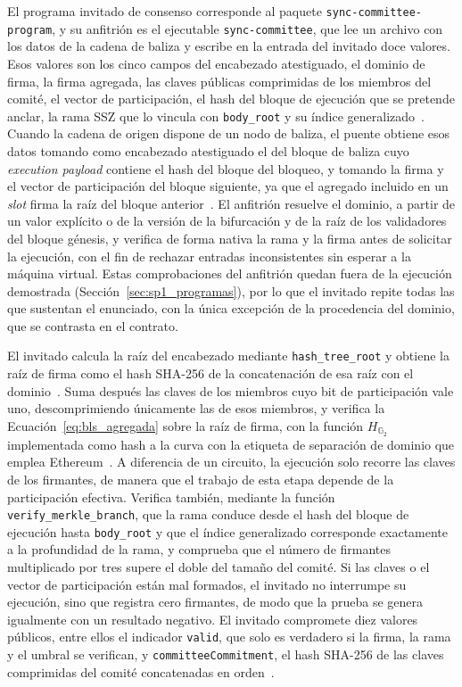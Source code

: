 El programa invitado de consenso corresponde al paquete \texttt{sync-committee-program}, y su
anfitrión es el ejecutable \texttt{sync-committee}, que lee un archivo con los datos de la cadena
de baliza y escribe en la entrada del invitado doce valores. Esos valores son los cinco campos del
encabezado atestiguado, el dominio de firma, la firma agregada, las claves públicas comprimidas
de los miembros del comité, el vector de participación, el hash del bloque de ejecución que se
pretende anclar, la rama SSZ que lo vincula con \texttt{body\_root} y su índice
generalizado~\cite{sp1synccommitteerepo}. Cuando la cadena de origen dispone de un nodo de baliza,
el puente obtiene esos datos tomando como encabezado atestiguado el del bloque de baliza cuyo
\textit{execution payload} contiene el hash del bloque del bloqueo, y tomando la firma y el vector
de participación del bloque siguiente, ya que el agregado incluido en un \textit{slot} firma la
raíz del bloque anterior~\cite{zkguaranibridgesp1, ethconsensusaltair}. El anfitrión resuelve el
dominio, a partir de un valor explícito o de la versión de la bifurcación y de la raíz de los
validadores del bloque génesis, y verifica de forma nativa la rama y la firma antes de solicitar
la ejecución, con el fin de rechazar entradas inconsistentes sin esperar a la máquina virtual.
Estas comprobaciones del anfitrión quedan fuera de la ejecución demostrada
(Sección~\ref{sec:sp1_programas}), por lo que el invitado repite todas las que sustentan el
enunciado, con la única excepción de la procedencia del dominio, que se contrasta en el contrato.

El invitado calcula la raíz del encabezado mediante \texttt{hash\_tree\_root} y obtiene la raíz de
firma como el hash SHA-256 de la concatenación de esa raíz con el dominio~\cite{ethconsensusphase0}.
Suma después las claves de los miembros cuyo bit de participación vale uno, descomprimiendo
únicamente las de esos miembros, y verifica la Ecuación~\eqref{eq:bls_agregada} sobre la raíz de
firma, con la función $H_{\mathbb{G}_2}$ implementada como hash a la curva con la etiqueta de
separación de dominio que emplea Ethereum~\cite{rfc9380}. A diferencia de un circuito, la
ejecución solo recorre las claves de los firmantes, de manera que el trabajo de esta etapa depende
de la participación efectiva. Verifica también, mediante la función \texttt{verify\_merkle\_branch},
que la rama conduce desde el hash del bloque de ejecución hasta \texttt{body\_root} y que el índice
generalizado corresponde exactamente a la profundidad de la rama, y comprueba que el número de
firmantes multiplicado por tres supere el doble del tamaño del comité. Si las claves o el vector de
participación están mal formados, el invitado no interrumpe su ejecución, sino que registra cero
firmantes, de modo que la prueba se genera igualmente con un resultado negativo. El invitado
compromete diez valores públicos, entre ellos el indicador \texttt{valid}, que solo es verdadero si
la firma, la rama y el umbral se verifican, y \texttt{committeeCommitment}, el hash SHA-256 de las
claves comprimidas del comité concatenadas en orden~\cite{sp1synccommitteerepo}.

